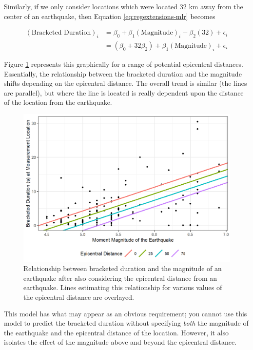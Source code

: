 \documentclass[
]{book}
\theoremstyle{plain}
\theoremstyle{mydefn}
\theoremstyle{myexmpl}
\theoremstyle{remark}
\begin{document}
Similarly, if we only consider locations which were located 32 km away from the center of an earthquake, then Equation \eqref{eq:regextensions-mlr} becomes

\[
\begin{aligned}
(\text{Bracketed Duration})_i &= \beta_0 + \beta_1(\text{Magnitude})_i + \beta_2(32) + \epsilon_i \\
  &= \left(\beta_0 + 32\beta_2\right) + \beta_1(\text{Magnitude})_i + \epsilon_i
\end{aligned}
\]

Figure \ref{fig:regextensions-mlr-plot} represents this graphically for a range of potential epicentral distances. Essentially, the relationship between the bracketed duration and the magnitude shifts depending on the epicentral distance. The overall trend is similar (the lines are parallel), but where the line is located is really dependent upon the distance of the location from the earthquake.

\begin{figure}

{\centering \includegraphics[width=0.8\linewidth]{./Images/regextensions-mlr-plot-1} 

}

\caption{Relationship between bracketed duration and the magnitude of an earthquake after also considering the epicentral distance from an earthquake. Lines estimating this relationship for various values of the epicentral distance are overlayed.}\label{fig:regextensions-mlr-plot}
\end{figure}

This model has what may appear as an obvious requirement; you cannot use this model to predict the bracketed duration without specifying \emph{both} the magnitude of the earthquake and the epicentral distance of the location. However, it also isolates the effect of the magnitude above and beyond the epicentral distance.
\end{document}
